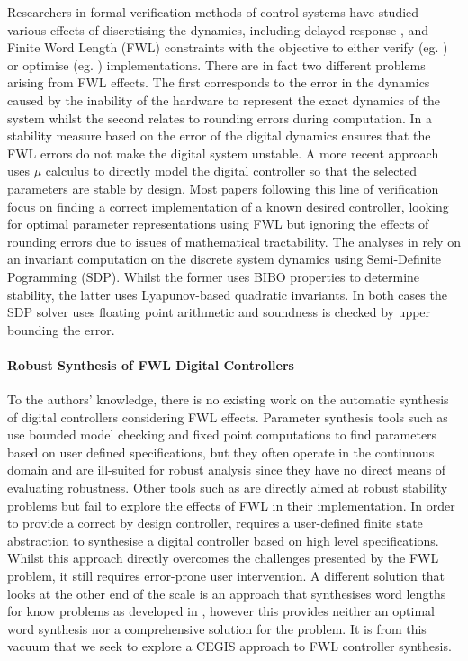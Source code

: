 \documentclass{sig-alternate-05-2015}
\begin{document}
Researchers in formal verification methods of control systems have studied various effects of discretising the dynamics, including delayed response \cite{Duggirala2015}, and Finite Word Length (FWL) constraints with the objective to either verify (eg. \cite{daes20161}) or optimise (eg. \cite{oudjida2014design}) implementations. There are in fact two different problems arising from FWL effects. The first corresponds to the error in the dynamics caused by the inability of the hardware to represent the exact dynamics of the system whilst the second relates to rounding errors during computation. 
In \cite{fialho1994stability} a stability measure based on the error of the digital dynamics ensures that the FWL errors do not make the digital system unstable. A more recent approach \cite{DBLP:journals/automatica/WuLCC09} uses $\mu$ calculus to directly model the digital controller so that the selected parameters are stable by design. Most papers following this line of verification focus on finding a correct implementation of a known desired controller, looking for optimal parameter representations using FWL but ignoring the effects of rounding errors due to issues of mathematical tractability.
The analyses in \cite{DBLP:conf/hybrid/WangGRJF16,DBLP:conf/hybrid/RouxJG15} rely on an invariant computation on the discrete system dynamics using Semi-Definite Pogramming (SDP). Whilst the former uses BIBO properties to determine stability, the latter uses Lyapunov-based quadratic invariants. In both cases the SDP solver uses floating point arithmetic and soundness is checked by upper bounding the error.

\paragraph{Robust Synthesis of FWL Digital Controllers}

To the authors' knowledge, there is no existing work on the automatic synthesis of digital controllers considering FWL effects. Parameter synthesis tools such as \cite{cimatti2013parameter} use bounded model checking and fixed point computations to find parameters based on user defined specifications, but they often operate in the continuous domain and are ill-suited for robust analysis since they have no direct means of evaluating robustness. Other tools such as \cite{economakos2016automated} are directly aimed at robust stability problems but fail to explore the effects of FWL in their implementation.
In order to provide a correct by design controller, \cite{alur2016compositional} requires a user-defined finite state abstraction to synthesise a digital controller based on high level specifications. Whilst this approach directly overcomes the challenges presented by the FWL problem, it still requires error-prone user intervention. A different solution that looks at the other end of the scale is an approach that synthesises word lengths for know problems as developed in \cite{jha2013swati}, however this provides neither an optimal word synthesis nor a comprehensive solution for the problem.
It is from this vacuum that we seek to explore a CEGIS approach to FWL controller synthesis.
\end{document}
